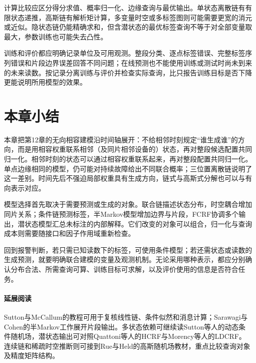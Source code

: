 计算比较应区分得分求值、概率归一化、边缘查询与最优输出。单状态离散链有有限状态递推，高斯链有解析矩计算，多变量时空或多标签图则可能需要更宽的消元或近似。隐状态链仍能精确求和，但含潜状态的最优标签查询不等于对全部变量取最大，参数训练也可能失去凸性。

训练和评价都应明确记录单位及可用观测。整段分类、逐点标签错误、完整标签序列错误和片段边界误差回答不同问题；在线预测也不能使用训练或测试时尚未到来的未来读数。按记录分离训练与评价并检查实际查询，比只报告训练目标是否下降更能说明所用模型的效果。

\section{本章小结}
\label{sec:pgm-dynamic-undirected-summary}

本章把第12章的无向相容建模沿时间轴展开：不给相邻时刻规定“谁生成谁”的方向，而是用相容权重联系相邻（及同片相邻设备的）状态，再对整段候选配置共同归一化。相邻时刻的状态可以通过相容权重联系起来，再对整段配置共同归一化。单点边缘相同的模型，仍可能对持续故障给出不同联合概率；三位置离散链说明了这一差别。时间先后不强迫局部权重具有生成方向，链式与高斯式分解也可以与有向表示对应。

模型选择首先取决于需要预测或生成的对象。联合链描述状态分布，时空耦合增加同片关系；条件链预测标签，半Markov模型增加边界与片段，FCRF协调多个输出，潜状态模型汇总未标注的内部解释。它们改变的对象可以组合，归一化与查询成本则需要随接口和因子作用域重新检查。

回到报警判断，若只需已知读数下的标签，可使用条件模型；若还需状态或读数的生成预测，就要明确联合建模的变量及观测机制。无论采用哪种表示，都应分别确认分布合法、所需查询可算、训练目标可求解，以及评价使用的信息是否符合任务。

\paragraph{延展阅读}
Sutton与McCallum的教程可用于复核线性链、条件似然和消息计算；Sarawagi与Cohen的半Markov工作展开片段输出。多状态依赖可继续读Sutton等人的动态条件随机场，潜状态输出可对照Quattoni等人的HCRF与Morency等人的LDCRF。连续链和稀疏时空推断则可接到Rue与Held的高斯随机场教材，重点比较查询对象及精度矩阵结构。
